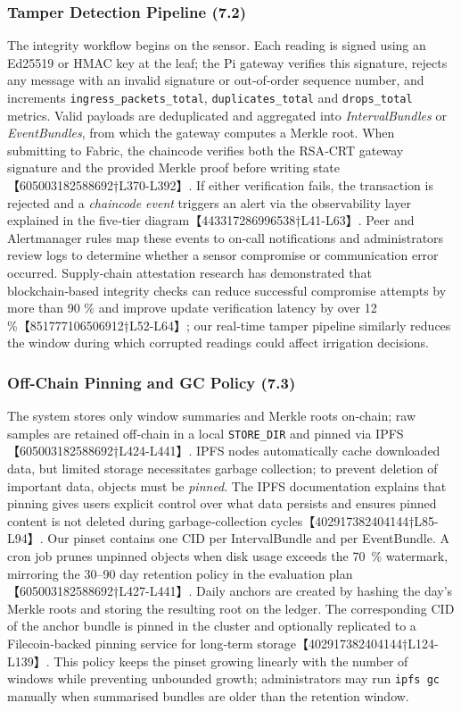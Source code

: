 \subsubsection{Tamper Detection Pipeline (7.2)}
The integrity workflow begins on the sensor.  Each reading is signed using
an Ed25519 or HMAC key at the leaf; the Pi gateway verifies this signature,
rejects any message with an invalid signature or out‑of‑order sequence
number, and increments \texttt{ingress\_packets\_total},
\texttt{duplicates\_total} and \texttt{drops\_total} metrics.  Valid
payloads are deduplicated and aggregated into \emph{IntervalBundles} or
\emph{EventBundles}, from which the gateway computes a Merkle root.  When
submitting to Fabric, the chaincode verifies both the RSA‑CRT gateway
signature and the provided Merkle proof before writing state【605003182588692†L370-L392】.
If either verification fails, the transaction is rejected and a
\emph{chaincode event} triggers an alert via the observability layer
explained in the five‑tier diagram【443317286996538†L41-L63】.  Peer and
Alertmanager rules map these events to on‑call notifications and
administrators review logs to determine whether a sensor compromise or
communication error occurred.  Supply‑chain attestation research has
demonstrated that blockchain‑based integrity checks can reduce successful
compromise attempts by more than 90 \% and improve update verification
latency by over 12 \%【851777106506912†L52-L64】; our real‑time tamper
pipeline similarly reduces the window during which corrupted readings could
affect irrigation decisions.

\subsubsection{Off‑Chain Pinning and GC Policy (7.3)}
The system stores only window summaries and Merkle roots on‑chain; raw
samples are retained off‑chain in a local \texttt{STORE\_DIR} and pinned
via IPFS【605003182588692†L424-L441】.  IPFS nodes automatically cache
downloaded data, but limited storage necessitates garbage collection; to
prevent deletion of important data, objects must be \emph{pinned}.  The
IPFS documentation explains that pinning gives users explicit control over
what data persists and ensures pinned content is not deleted during
garbage‑collection cycles【402917382404144†L85-L94】.  Our pinset contains one
CID per IntervalBundle and per EventBundle.  A cron job prunes unpinned
objects when disk usage exceeds the 70~\% watermark, mirroring the
30–90 day retention policy in the evaluation plan【605003182588692†L427-L441】.
Daily anchors are created by hashing the day’s Merkle roots and storing
the resulting root on the ledger.  The corresponding CID of the anchor
bundle is pinned in the cluster and optionally replicated to a
Filecoin‑backed pinning service for long‑term storage【402917382404144†L124-L139】.
This policy keeps the pinset growing linearly with the number of windows
while preventing unbounded growth; administrators may run \texttt{ipfs gc}
manually when summarised bundles are older than the retention window.

